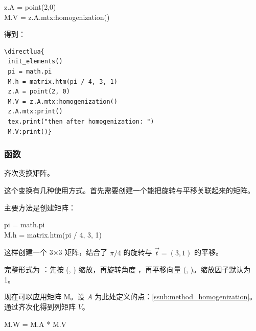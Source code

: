 \begin{mybox}
z.A = point(2,0)\\
M.V = z.A.mtx:homogenization()
\end{mybox}
得到：

\begin{minipage}{.5\textwidth}
\begin{verbatim}
\directlua{
 init_elements()
 pi = math.pi
 M.h = matrix.htm(pi / 4, 3, 1)
 z.A = point(2, 0)
 M.V = z.A.mtx:homogenization()
 z.A.mtx:print()
 tex.print("then after homogenization: ")
 M.V:print()}
\end{verbatim}
\end{minipage}
\begin{minipage}{.5\textwidth}
\end{minipage}

\subsubsection{函数 }
\label{ssub:method_htm}
齐次变换矩阵。

这个变换有几种使用方式。首先需要创建一个能把旋转与平移关联起来的矩阵。

主要方法是创建矩阵：

\begin{mybox}
  pi  = math.pi\\
  M.h   = matrix.htm(pi / 4, 3, 1)
\end{mybox}

这样创建一个 3×3 矩阵，结合了 $\pi/4$ 的旋转与 $\overrightarrow{t}=(3,1)$ 的平移。

完整形式为 ：先按 (, ) 缩放，再旋转角度 ，再平移向量 (, )。缩放因子默认为 1。



现在可以应用矩阵 M。设 $A$ 为此处定义的点：\ref{ssub:method_homogenization}。通过齐次化得到列矩阵 $V$。


\begin{mybox}
M.W = M.A * M.V
\end{mybox}


